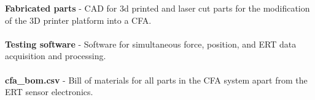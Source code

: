 \textbf{Fabricated parts} - CAD for 3d printed and laser cut parts  for the modification of the 3D printer platform into a CFA.
\\ \\
\textbf{Testing software} - Software for simultaneous force, position, and ERT data acquisition and processing.
\\ \\
\textbf{cfa\_bom.csv} - Bill of materials for all parts in the CFA system apart from the ERT sensor electronics.



